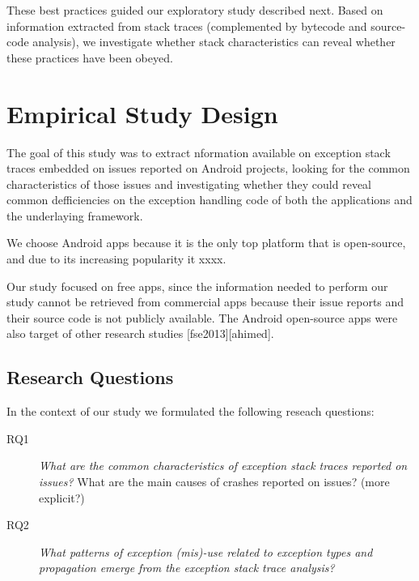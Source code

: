 \documentclass[conference]{IEEEtran}
\begin{document}
These best practices guided our exploratory study described next.
Based on information extracted from stack traces (complemented by
bytecode and source-code analysis), we investigate whether stack characteristics
can reveal whether these practices have been obeyed. 


\section{Empirical Study Design}

The goal of this study was to extract nformation available on exception stack 
traces embedded on issues reported on Android projects, looking for the common characteristics of
those issues and investigating whether they could reveal common defficiencies
on the exception handling code of both the applications and the underlaying 
 framework. 

We choose Android apps because it is the only top platform that is open-source,
and due to its increasing popularity it xxxx.

Our study focused on free apps, since the information needed to perform our study
cannot be retrieved from commercial apps because their issue reports and their
source code is not publicly available. The Android open-source apps were also 
target of other research studies [fse2013][ahimed].   


\subsection{Research Questions}
In the context of our study we formulated the following reseach questions:

\begin{description}

  \item[RQ1] \noindent\emph{What are the common characteristics of exception stack traces reported on issues?} What are the main causes of crashes reported on issues? (more explicit?)

  \item[RQ2] \noindent\emph{What patterns of exception (mis)-use related to exception types and propagation emerge from the exception stack trace analysis?}

\end{description}



\end{document}
